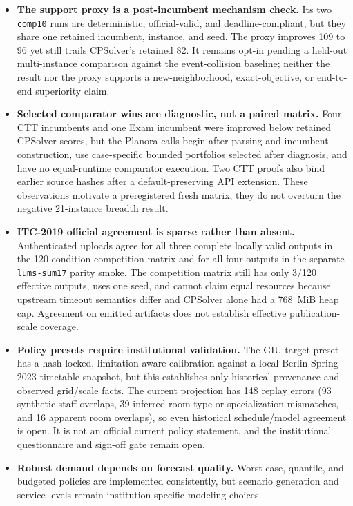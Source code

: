 \begin{itemize}[leftmargin=*]
  \item \textbf{The support proxy is a post-incumbent mechanism check.} Its two \texttt{comp10} runs are deterministic, official-valid, and deadline-compliant, but they share one retained incumbent, instance, and seed. The proxy improves 109 to 96 yet still trails CPSolver's retained 82. It remains opt-in pending a held-out multi-instance comparison against the event-collision baseline; neither the result nor the proxy supports a new-neighborhood, exact-objective, or end-to-end superiority claim.
  \item \textbf{Selected comparator wins are diagnostic, not a paired matrix.} Four CTT incumbents and one Exam incumbent were improved below retained CPSolver scores, but the Planora calls begin after parsing and incumbent construction, use case-specific bounded portfolios selected after diagnosis, and have no equal-runtime comparator execution. Two CTT proofs also bind earlier source hashes after a default-preserving API extension. These observations motivate a preregistered fresh matrix; they do not overturn the negative 21-instance breadth result.
  \item \textbf{ITC-2019 official agreement is sparse rather than absent.} Authenticated uploads agree for all three complete locally valid outputs in the 120-condition competition matrix and for all four outputs in the separate \texttt{lums-sum17} parity smoke. The competition matrix still has only 3/120 effective outputs, uses one seed, and cannot claim equal resources because upstream timeout semantics differ and CPSolver alone had a 768~MiB heap cap. Agreement on emitted artifacts does not establish effective publication-scale coverage.
  \item \textbf{Policy presets require institutional validation.} The GIU target preset has a hash-locked, limitation-aware calibration against a local Berlin Spring 2023 timetable snapshot, but this establishes only historical provenance and observed grid/scale facts. The current projection has 148 replay errors (93 synthetic-staff overlaps, 39 inferred room-type or specialization mismatches, and 16 apparent room overlaps), so even historical schedule/model agreement is open. It is not an official current policy statement, and the institutional questionnaire and sign-off gate remain open.
  \item \textbf{Robust demand depends on forecast quality.} Worst-case, quantile, and budgeted policies are implemented consistently, but scenario generation and service levels remain institution-specific modeling choices.

\end{itemize}
